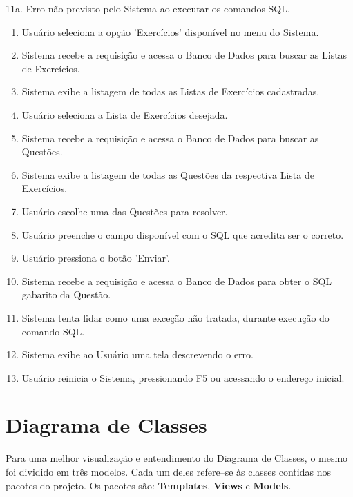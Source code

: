 \documentclass[graduacao,brazil]{ThesisPUC}
\begin{document}
11a. Erro n\~{a}o previsto pelo Sistema ao executar os comandos SQL.

\begin{enumerate}
  \item Usu\'{a}rio seleciona a opção 'Exerc\'{i}cios' dispon\'{i}vel no menu do Sistema.
  \item Sistema recebe a requisi\c{c}\~{a}o e acessa o Banco de Dados para buscar as Listas de Exerc\'{i}cios.
  \item Sistema exibe a listagem de todas as Listas de Exerc\'{i}cios cadastradas.
  \item Usu\'{a}rio seleciona a Lista de Exerc\'{i}cios desejada.
  \item Sistema recebe a requisi\c{c}\~{a}o e acessa o Banco de Dados para buscar as Quest\~{o}es.
  \item Sistema exibe a listagem de todas as Quest\~{o}es da respectiva Lista de Exerc\'{i}cios.
  \item Usu\'{a}rio escolhe uma das Quest\~{o}es para resolver.
  \item Usu\'{a}rio preenche o campo dispon\'{i}vel com o SQL que acredita ser o correto.
  \item Usu\'{a}rio pressiona o bot\~{a}o 'Enviar'.
  \item Sistema recebe a requisi\c{c}\~{a}o e acessa o Banco de Dados para obter o SQL gabarito da Quest\~{a}o.
  \item Sistema tenta lidar como uma exce\c{c}\~{a}o n\~{a}o tratada, durante execu\c{c}\~{a}o do comando SQL.
  \item Sistema exibe ao Usu\'{a}rio uma tela descrevendo o erro.
  \item Usu\'{a}rio reinicia o Sistema, pressionando F5 ou acessando o endere\c{c}o inicial.
\end{enumerate}


\section{Diagrama de Classes}

Para uma melhor visualiza\c{c}\~{a}o e entendimento do Diagrama de Classes, o mesmo foi
dividido em tr\^{e}s modelos. Cada um deles refere--se \`{a}s classes contidas nos pacotes do
projeto. Os pacotes s\~{a}o: \textbf{Templates}, \textbf{Views} e \textbf{Models}.
\end{document}
